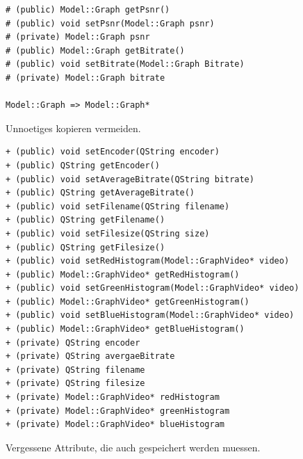 \documentclass[parskip=full]{scrartcl}
\begin{document}
\begin{verbatim}
# (public) Model::Graph getPsnr()
# (public) void setPsnr(Model::Graph psnr)
# (private) Model::Graph psnr
# (public) Model::Graph getBitrate()
# (public) void setBitrate(Model::Graph Bitrate)
# (private) Model::Graph bitrate

Model::Graph => Model::Graph*
\end{verbatim}
Unnoetiges kopieren vermeiden.

\begin{verbatim}
+ (public) void setEncoder(QString encoder)
+ (public) QString getEncoder()
+ (public) void setAverageBitrate(QString bitrate)
+ (public) QString getAverageBitrate()
+ (public) void setFilename(QString filename)
+ (public) QString getFilename()
+ (public) void setFilesize(QString size)
+ (public) QString getFilesize()
+ (public) void setRedHistogram(Model::GraphVideo* video)
+ (public) Model::GraphVideo* getRedHistogram()
+ (public) void setGreenHistogram(Model::GraphVideo* video)
+ (public) Model::GraphVideo* getGreenHistogram()
+ (public) void setBlueHistogram(Model::GraphVideo* video)
+ (public) Model::GraphVideo* getBlueHistogram()
+ (private) QString encoder
+ (private) QString avergaeBitrate
+ (private) QString filename
+ (private) QString filesize
+ (private) Model::GraphVideo* redHistogram
+ (private) Model::GraphVideo* greenHistogram
+ (private) Model::GraphVideo* blueHistogram
\end{verbatim}
Vergessene Attribute, die auch gespeichert werden muessen.
\end{document}
